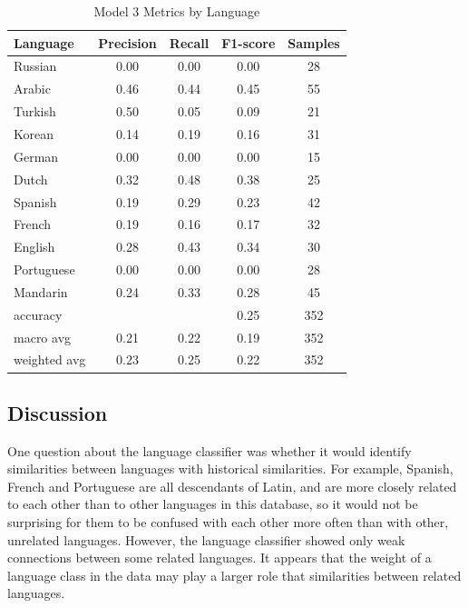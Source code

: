 \begin{table}
\begin{center}
\caption{Model 3 Metrics by Language}
\begin{tabular}{l c c c| c}
Language  &Precision &Recall &F1-score&Samples\\ \hline
Russian	&0.00	&0.00	&0.00	&28\\
Arabic	&0.46	&0.44	&0.45	&55\\     
Turkish	&0.50	&0.05	&0.09	&21\\      
Korean	&0.14	&0.19 	&0.16	&31\\      
German	&0.00	&0.00	& 0.00 	&15\\       
Dutch	&0.32	&0.48	&0.38	&25\\   
Spanish	&0.19	&0.29	&0.23	&42\\      
French	&0.19	&0.16	&0.17	&32\\    
English	&0.28	&0.43	&0.34	&30\\  
Portuguese&0.00	&0.00	&0.00	&28\\    
Mandarin	&0.24	&0.33	&0.28	&45\\ \hline
      
accuracy		&		&		&0.25	&352\\
macro avg		& 0.21	&0.22	&0.19	&352\\
weighted avg	& 0.23	&0.25	&0.22	&352\\ \hline
\end{tabular}
\label{tab:LangClassReport}
\end{center}
\end{table}

\subsection{Discussion}
One question about the language classifier was whether it would identify similarities between languages with historical similarities. For example, Spanish, French and Portuguese are all descendants of Latin, and are more closely related to each other than to other languages in this database, so it would not be surprising for them to be confused with each other more often than with other, unrelated languages.  However, the language classifier showed only weak connections between some related languages. It appears that the weight of a language class in the data may play a larger role that similarities between related languages.

